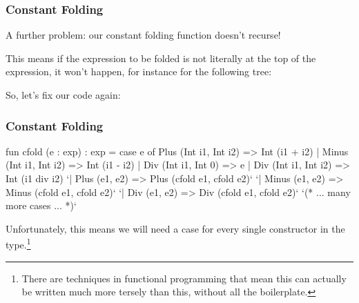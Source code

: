 \documentclass[aspectratio=169]{beamer}
\begin{document}
\begin{frame}[fragile]
  \frametitle{Constant Folding}

  A further problem: our constant folding function doesn't recurse!

  \vspace{\fill}

  This means if the expression to be folded is not literally at the top
  of the expression, it won't happen, for instance for the following tree:

  \begin{center}
  \end{center}

  \vspace{\fill}

  So, let's fix our code again:
\end{frame}

\begin{frame}[fragile]
  \frametitle{Constant Folding}

  {\small
  \begin{codeblock}
    fun cfold (e : exp) : exp =
      case e of
        Plus  (Int i1, Int i2) => Int (i1 + i2)
      | Minus (Int i1, Int i2) => Int (i1 - i2)
      | Div   (Int i1, Int 0)  => e
      | Div   (Int i1, Int i2) => Int (i1 div i2)
      `| Plus  (e1, e2) => Plus  (cfold e1, cfold e2)`
      `| Minus (e1, e2) => Minus (cfold e1, cfold e2)`
      `| Div   (e1, e2) => Div   (cfold e1, cfold e2)`
      `(* ... many more cases ... *)`
  \end{codeblock}
  }

  \vspace{\fill}

  Unfortunately, this means we will need a case for every single
  constructor in the  type.\footnote{There are techniques in
  functional programming that mean this can actually be written much more
  tersely than this, without all the boilerplate.}
\end{frame}
\end{document}
